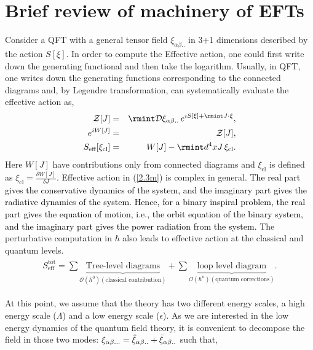 \section{Brief review of machinery of EFTs}\label{Sec2}
Consider a QFT with a general tensor field $\xi_{\alpha\beta..}$ in 3+1 dimensions described by the action $S[\xi]$. In order to compute the Effective action, one could first write down the generating functional and then take the logarithm. Usually, in QFT, one writes down the generating functions corresponding to the connected diagrams and, by Legendre transformation, can systematically evaluate the effective action as,
\begin{eqnarray}
        \mathcal{Z}[J]&=&\rmint \mathcal{D}\xi_{\alpha\beta..} \, e^{iS[\xi]+\rmint J\cdot \xi},\nonumber\\
      e^{i W[J]}&=& \mathcal{Z}[J],\\
      S_{\text{eff}}[\xi_{\text{cl}}]&=& W[J]-\rmint d^4x J\,\xi_{\text{cl}}.\nonumber \label{2.3m}
\end{eqnarray}
Here $W[J]$ have contributions only from connected diagrams and $\xi_{\text{cl}}$ is defined as $\xi_{\text{cl}}=\frac{\delta W[J]}{\delta J}$. 
 Effective action in (\ref{2.3m}) is complex in general. \textcolor{black}{The real part gives the conservative dynamics of the system, and the imaginary part gives the radiative dynamics of the system. Hence, for a binary inspiral problem, the real part gives the equation of motion, i.e., the orbit equation of the binary system, and the imaginary part gives the power radiation from the system.} The perturbative computation in $\hbar$ also leads to effective action at the classical and quantum levels.
 \begin{align}
     \begin{split}
S_{\text{eff}}^{\text{tot}}=\sum \underbrace{\text{Tree-level diagrams}}_{\mathcal{O}(\hbar^0)(\text{classical contribution})}+ \sum \underbrace{\text{loop level diagram}}_{\mathcal{O}(\hbar^n)(\text{quantum corrections})}. \label{Stotal}
     \end{split}
 \end{align}
 \par
 At this point, we assume that the theory has two different energy scales, a high energy scale ($\Lambda$) and a low energy scale ($\epsilon$). As we are interested in the low energy dynamics of the quantum field theory, it is convenient to decompose the field in those two modes: $\xi_{\alpha\beta...}=\hat{\xi}_{\alpha\beta..}+\Bar{\xi}_{\alpha\beta..}$ such that,
